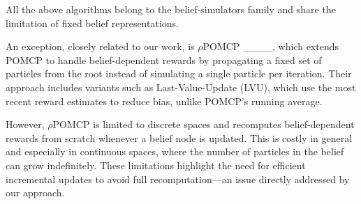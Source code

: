 	All the above algorithms belong to the belief-simulators family and share the limitation of fixed belief representations.  

	An exception, closely related to our work, is $\rho$POMCP ____, which extends POMCP to handle belief-dependent rewards by propagating a fixed set of particles from the root instead of simulating a single particle per iteration. Their approach includes variants such as Last-Value-Update (LVU), which use the most recent reward estimates to reduce bias, unlike POMCP’s running average.

	However, $\rho$POMCP is limited to discrete spaces and recomputes belief-dependent rewards from scratch whenever a belief node is updated. This is costly in general and especially in continuous spaces, where the number of particles in the belief can grow indefinitely. These limitations highlight the need for efficient incremental updates to avoid full recomputation—an issue directly addressed by our approach.





